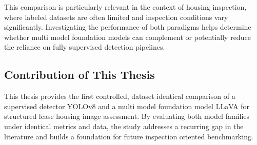 This comparison is particularly relevant in the context of housing inspection\cite{kang_improvement_2025}, 
where labeled datasets are often limited and inspection conditions vary 
significantly. Investigating the performance of both paradigms helps determine whether multi model foundation models can complement or potentially reduce the reliance on fully supervised detection pipelines.

\subsection{Contribution of This Thesis}

This thesis provides the first controlled, dataset identical comparison of a supervised detector YOLOv8 and a multi model foundation model LLaVA for structured lease housing image assessment. By evaluating both model families under identical metrics and data, the study addresses a recurring gap in the literature and builds a foundation for future inspection oriented benchmarking.